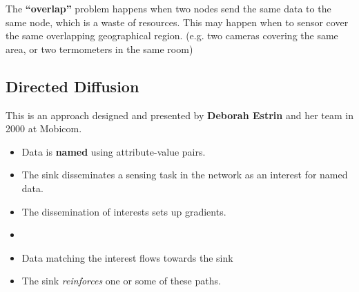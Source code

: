 The \textbf{``overlap''} problem happens when two nodes send the same data to the same node, which is a waste of resources. 
This may happen when to sensor cover the same overlapping geographical region. (e.g. two cameras covering the same area, or two termometers in the same room)

\subsection{Directed Diffusion}
This is an approach designed and presented by \textbf{Deborah Estrin} and her team in 2000 at Mobicom.

\begin{itemize}
   \item Data is \textbf{named} using attribute-value pairs.
   \item The sink disseminates a sensing task in the network as an interest for named data.
   \item The dissemination of interests sets up gradients.
   \item {}
   \item Data matching the interest flows towards the sink
   \item The sink \textit{reinforces} one or some of these paths.
\end{itemize}
